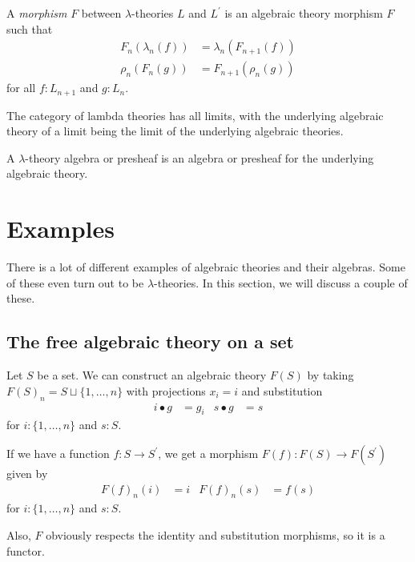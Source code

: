 \begin{definition}
  A \textit{morphism} $ F $ between $ \lambda $-theories $ L $ and $ L^\prime $ is an algebraic theory morphism $ F $ such that
  \begin{align*}
    F_n(\lambda_n(f)) &= \lambda_n(F_{n + 1}(f))\\
    \rho_n(F_n(g)) &= F_{n + 1}(\rho_n(g))
  \end{align*}
  for all $ f: L_{n + 1} $ and $ g: L_n $.
\end{definition}

\begin{remark}
  The category of lambda theories has all limits, with the underlying algebraic theory of a limit being the limit of the underlying algebraic theories.
\end{remark}

\begin{definition}
  A $ \lambda $-theory algebra or presheaf is an algebra or presheaf for the underlying algebraic theory.
\end{definition}

\section{Examples}

There is a lot of different examples of algebraic theories and their algebras. Some of these even turn out to be $ \lambda $-theories. In this section, we will discuss a couple of these.

\subsection{The free algebraic theory on a set}
\begin{example}
  Let $ S $ be a set. We can construct an algebraic theory $ F(S) $ by taking $ F(S)_n = S \sqcup \{ 1, \dots, n \} $ with projections $ x_i = i $ and substitution
  \begin{align*}
    i \bullet g &= g_i & s \bullet g &= s
  \end{align*}
  for $ i : \{ 1, \dots, n \} $ and $ s : S $.

  If we have a function $ f: S \to S^\prime $, we get a morphism $ F(f): F(S) \to F(S^\prime) $ given by
  \begin{align*}
    F(f)_n(i) &= i & F(f)_n(s) &= f(s)
  \end{align*}
  for $ i : \{ 1, \dots, n \} $ and $ s : S $.

  Also, $ F $ obviously respects the identity and substitution morphisms, so it is a functor.
\end{example}

